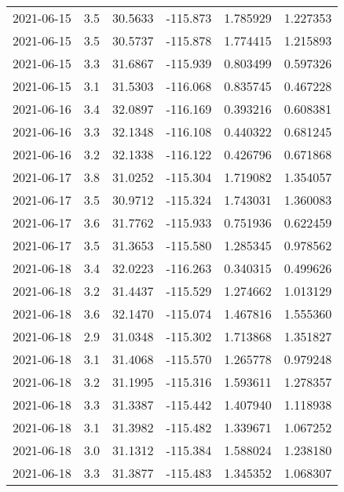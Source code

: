 \begin{tabular}{lrrrrr}
2021-06-15 &       3.5 &  30.5633 &  -115.873 &         1.785929 &         1.227353 \\
2021-06-15 &       3.5 &  30.5737 &  -115.878 &         1.774415 &         1.215893 \\
2021-06-15 &       3.3 &  31.6867 &  -115.939 &         0.803499 &         0.597326 \\
2021-06-15 &       3.1 &  31.5303 &  -116.068 &         0.835745 &         0.467228 \\
2021-06-16 &       3.4 &  32.0897 &  -116.169 &         0.393216 &         0.608381 \\
2021-06-16 &       3.3 &  32.1348 &  -116.108 &         0.440322 &         0.681245 \\
2021-06-16 &       3.2 &  32.1338 &  -116.122 &         0.426796 &         0.671868 \\
2021-06-17 &       3.8 &  31.0252 &  -115.304 &         1.719082 &         1.354057 \\
2021-06-17 &       3.5 &  30.9712 &  -115.324 &         1.743031 &         1.360083 \\
2021-06-17 &       3.6 &  31.7762 &  -115.933 &         0.751936 &         0.622459 \\
2021-06-17 &       3.5 &  31.3653 &  -115.580 &         1.285345 &         0.978562 \\
2021-06-18 &       3.4 &  32.0223 &  -116.263 &         0.340315 &         0.499626 \\
2021-06-18 &       3.2 &  31.4437 &  -115.529 &         1.274662 &         1.013129 \\
2021-06-18 &       3.6 &  32.1470 &  -115.074 &         1.467816 &         1.555360 \\
2021-06-18 &       2.9 &  31.0348 &  -115.302 &         1.713868 &         1.351827 \\
2021-06-18 &       3.1 &  31.4068 &  -115.570 &         1.265778 &         0.979248 \\
2021-06-18 &       3.2 &  31.1995 &  -115.316 &         1.593611 &         1.278357 \\
2021-06-18 &       3.3 &  31.3387 &  -115.442 &         1.407940 &         1.118938 \\
2021-06-18 &       3.1 &  31.3982 &  -115.482 &         1.339671 &         1.067252 \\
2021-06-18 &       3.0 &  31.1312 &  -115.384 &         1.588024 &         1.238180 \\
2021-06-18 &       3.3 &  31.3877 &  -115.483 &         1.345352 &         1.068307 \\

\end{tabular}
